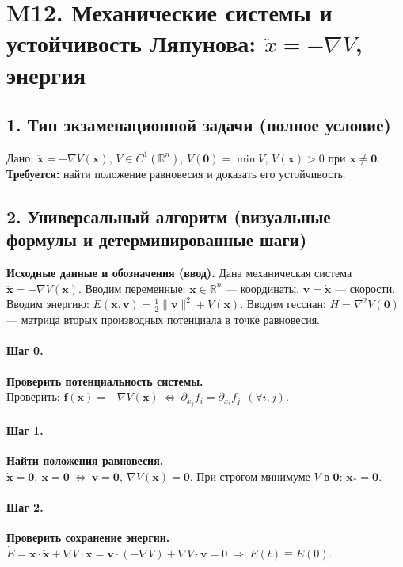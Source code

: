 \section{M12. Механические системы и устойчивость Ляпунова: $\ddot{x}=-\nabla V$, энергия}

\subsection*{1. Тип экзаменационной задачи (полное условие)}
Дано: \(\ddot{\mathbf x}=-\nabla V(\mathbf x)\), \(V\in C^{1}(\mathbb R^{n})\), 
\(V(\mathbf 0)=\min V\), \(V(\mathbf x)>0\) при \(\mathbf x\neq \mathbf 0\). 
\textbf{Требуется:} найти положение равновесия и доказать его устойчивость.

\subsection*{2. Универсальный алгоритм (визуальные формулы и детерминированные шаги)}

\textbf{Исходные данные и обозначения (ввод).} Дана механическая система \(\ddot{\mathbf x}=-\nabla V(\mathbf x)\).
Вводим переменные: \(\mathbf x\in\mathbb R^{n}\) — координаты, \(\mathbf v=\dot{\mathbf x}\) — скорости.
Вводим энергию: \(E(\mathbf x,\mathbf v)=\tfrac12\|\mathbf v\|^{2}+V(\mathbf x)\).
Вводим гессиан: \(H=\nabla^{2}V(\mathbf 0)\) — матрица вторых производных потенциала в точке равновесия.

\paragraph{Шаг 0.} \textbf{Проверить потенциальность системы.}\\
Проверить: \(\mathbf f(\mathbf x)=-\nabla V(\mathbf x)\ \Leftrightarrow\ \partial_{x_j}f_i=\partial_{x_i}f_j\ \ (\forall i,j)\).

\paragraph{Шаг 1.} \textbf{Найти положения равновесия.}\\
\(\dot{\mathbf x}=\mathbf 0,\ \ddot{\mathbf x}=\mathbf 0\ \Longleftrightarrow\ \mathbf v=\mathbf 0,\ \nabla V(\mathbf x)=\mathbf 0\). 
При строгом минимуме \(V\) в \(\mathbf 0\): \(\boxed{\mathbf x_*=\mathbf 0}\).

\paragraph{Шаг 2.} \textbf{Проверить сохранение энергии.}\\
\(\dot E=\dot{\mathbf x}\cdot\ddot{\mathbf x}+\nabla V\cdot\dot{\mathbf x}
=\mathbf v\cdot(-\nabla V)+\nabla V\cdot\mathbf v=0
\ \Rightarrow\ \boxed{E(t)\equiv E(0)}\).

